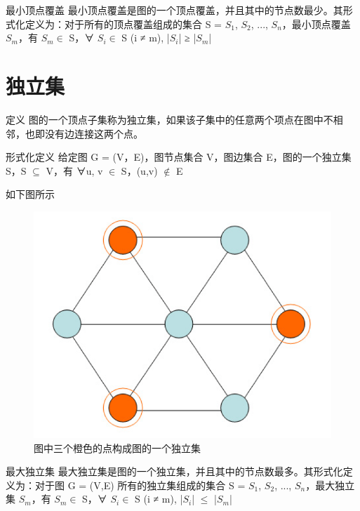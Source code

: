 \begin{definition}{最小顶点覆盖}
    最小顶点覆盖是图的一个顶点覆盖，并且其中的节点数最少。其形式化定义为：对于所有的顶点覆盖组成的集合 S = {$ S_1 $, $ S_2 $, ..., $ S_n $}，最小顶点覆盖 $ S_m $，有 $ S_m \in $ S，∀ $ S_i \in $ S (i ≠ m), |$ S_i $| ≥ |$ S_m $|
\end{definition}


\section{独立集}

\begin{definition}{定义}
    图的一个顶点子集称为独立集，如果该子集中的任意两个项点在图中不相邻，也即没有边连接这两个点。
\end{definition}

\begin{definition}{形式化定义}
    给定图 G = (V，E)，图节点集合 V，图边集合 E，图的一个独立集 S，S $\subseteq$ V，有 ∀u, v $\in$ S，(u,v) $\notin$ E
\end{definition}

\begin{example}
    如下图所示
	\begin{figure}[hbt]
        \centering
        \includegraphics{image/Proof-of-Statute2.png}
        \caption{图中三个橙色的点构成图的一个独立集}\label{fig:example}
    \end{figure}
\end{example}

\begin{definition}{最大独立集}
    最大独立集是图的一个独立集，并且其中的节点数最多。其形式化定义为：对于图 G = (V,E) 所有的独立集组成的集合 S = {$ S_1 $, $ S_2 $, ..., $ S_n $}，最大独立集 $ S_m $，有 $ S_m \in $ S，∀ $ S_i \in $ S (i ≠ m), |$ S_i $| $ \leq $ |$ S_m $|
\end{definition}


